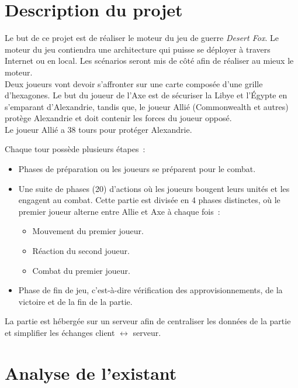 \section{Description du projet}

Le but de ce projet est de réaliser le moteur du jeu de guerre \emph{Desert Fox}.
Le moteur du jeu contiendra une architecture qui puisse se déployer à travers Internet ou en local.
Les scénarios seront mis de côté afin de réaliser au mieux le moteur.\\

Deux joueurs vont devoir s'affronter sur une carte composée d'une grille d'hexagones.
Le but du joueur de l'Axe est de sécuriser la Libye et l'Égypte en s'emparant d'Alexandrie, tandis que, le joueur Allié (Commonwealth et autres) protège Alexandrie et doit contenir les forces du joueur opposé.\\
Le joueur Allié a 38 tours pour protéger Alexandrie.

Chaque tour possède plusieurs étapes :
\begin{itemize}
    \item Phases de préparation ou les joueurs se préparent pour le combat.
    \item Une suite de phases (20) d'actions où les joueurs bougent leurs unités et les engagent au combat.
          Cette partie est divisée en 4 phases distinctes, où le premier joueur alterne entre Allie et Axe à chaque fois :
          \begin{itemize}
              \item Mouvement du premier joueur.
              \item Réaction du second joueur.
              \item Combat du premier joueur.
          \end{itemize}
    \item Phase de fin de jeu, c'est-à-dire vérification des approvisionnements, de la victoire et de la fin de la partie.
\end{itemize}


La partie est hébergée sur un serveur afin de centraliser les données de la partie et simplifier les échanges client $\leftrightarrow$ serveur.

\section{Analyse de l'existant}

